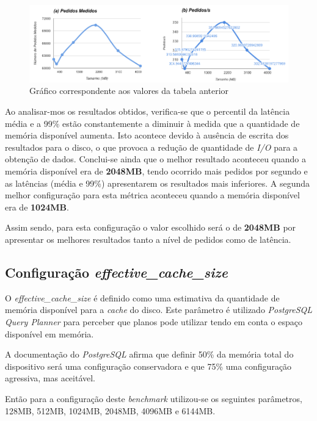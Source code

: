 \begin{figure}[ht!]
\centering
\includegraphics[width=\textwidth]{img/01_sb.png}
\caption{Gráfico correspondente aos valores da tabela anterior\label{overflow}}
\end{figure}

Ao analisar-mos os resultados obtidos, verifica-se que o percentil da latência média e a 99\% estão constantemente a diminuir à medida que a quantidade de memória disponível aumenta. Isto acontece devido à ausência de escrita dos resultados para o disco, o que provoca a redução de quantidade de \textit{I/O} para a obtenção de dados. Conclui-se ainda que o melhor resultado aconteceu quando a memória disponível era de \textbf{2048MB}, tendo ocorrido mais pedidos por segundo e as latências (média e 99\%) apresentarem os resultados mais inferiores. A segunda melhor configuração para esta métrica aconteceu quando a memória disponível era de \textbf{1024MB}.

Assim sendo, para esta configuração o valor escolhido será o de \textbf{2048MB} por apresentar os melhores resultados tanto a nível de pedidos como de latência.

\newpage

\subsection{Configuração \textit{effective\_cache\_size}}

O \textit{effective\_cache\_size} é definido como uma estimativa da quantidade de memória disponível para a \textit{cache} do disco. Este parâmetro é utilizado \textit{PostgreSQL Query Planner} para perceber que planos pode utilizar tendo em conta o espaço disponível em memória.

A documentação do \textit{PostgreSQL} afirma que definir 50\% da memória total do dispositivo será uma configuração conservadora e que 75\% uma configuração agressiva, mas aceitável.

Então para a configuração deste \textit{benchmark} utilizou-se os seguintes parâmetros, 128MB, 512MB, 1024MB, 2048MB, 4096MB e 6144MB.

